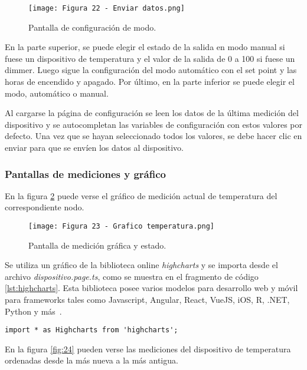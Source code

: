 \newpage
\begin{figure}[h]
\centering
\texttt{[image: Figura 22 - Enviar datos.png]}
\caption[Pantalla de configuración de modo]{Pantalla de configuración de modo.}
\label{fig:22}
\end{figure}

En la parte superior, se puede elegir el estado de la salida en modo manual si fuese un dispositivo de temperatura y el valor de la salida de 0 a 100 si fuese un dimmer. Luego sigue la configuración del modo automático con el set point y las horas de encendido y apagado. Por último, en la parte inferior se puede elegir el modo, automático o manual.

Al cargarse la página de configuración se leen los datos de la última medición del dispositivo y se autocompletan las variables de configuración con estos valores por defecto. Una vez que se hayan seleccionado todos los valores, se debe hacer clic en enviar para que se envíen los datos al dispositivo.

\subsubsection{Pantallas de mediciones y gráfico}

En la figura \ref{fig:23} puede verse el gráfico de medición actual de temperatura del correspondiente nodo.

\begin{figure}[h]
\centering
\texttt{[image: Figura 23 - Grafico temperatura.png]}
\caption[Pantalla de medición gráfica y estado]{Pantalla de medición gráfica y estado.}
\label{fig:23}
\end{figure}

Se utiliza un gráfico de la biblioteca online \textit{highcharts} y se importa desde el archivo \textit{dispositivo.page.ts}, como se muestra en el fragmento de código \ref{lst:highcharts}. Esta biblioteca posee varios modelos para desarrollo web y móvil para frameworks tales como Javascript, Angular, React, VueJS, iOS, R, .NET, Python y más\ \citep{33}.

\begin{lstlisting}[caption={Importación de gráfico de \textit{highcharts}.}, label={lst:highcharts}]
import * as Highcharts from 'highcharts';
\end{lstlisting}

En la figura \ref{fig:24} pueden verse las mediciones del dispositivo de temperatura ordenadas desde la más nueva a la más antigua.

